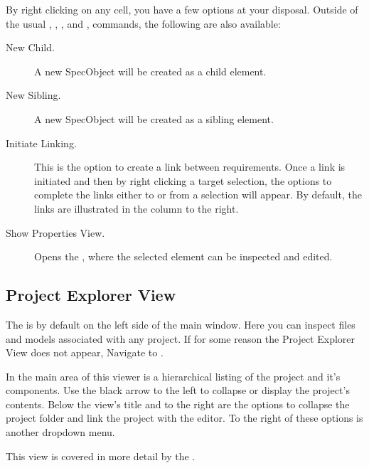 By right clicking on any cell, you have a few options at your disposal. Outside of the usual , , ,  and , commands, the following are also available:

\begin{description}
\item
  [New Child.] A new SpecObject will be created as a child element.
\item
  [New Sibling.] A new SpecObject will be created as a sibling element.
\item
  [Initiate Linking.] This is the option to create a link between requirements. Once a link is initiated and then by right clicking a target selection, the options to complete the links either to or from a selection will appear. By default, the links are illustrated in the  column to the right. 
\item
  [Show Properties View.] Opens the , where the selected element can be inspected and edited.
\end{description}

\subsection{Project Explorer View}
\label{sec:project-explorer}

The  is by default on the left side of the main window. Here you can inspect files and models associated with any project. If for some reason the Project Explorer View does not appear, Navigate to .

In the main area  of this viewer is a hierarchical listing of the project and it's components. Use the black arrow to the left to collapse or display the project's contents. Below the view's title and to the right are the options to collapse the project folder and link the project with the editor. To the right of these options is another dropdown menu.

This view is covered in more detail by the .

